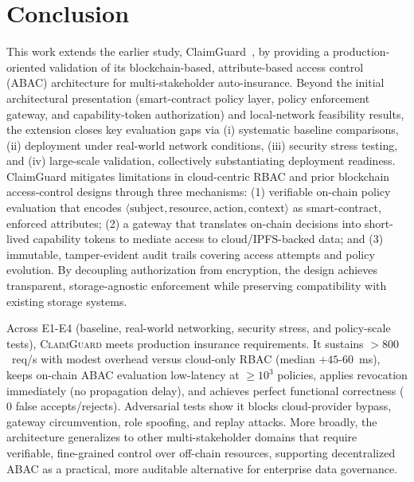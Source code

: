 \documentclass[final,5p,times,twocolumn]{elsarticle}
\begin{document}
\section{Conclusion}
This work extends the earlier study, ClaimGuard~\cite{eneh2025claimguard}, by providing a production-oriented validation of its blockchain-based, attribute-based access control (ABAC) architecture for multi-stakeholder auto-insurance. Beyond the initial architectural presentation (smart-contract policy layer, policy enforcement gateway, and capability-token authorization) and local-network feasibility results, the extension closes key evaluation gaps via (i) systematic baseline comparisons, (ii) deployment under real-world network conditions, (iii) security stress testing, and (iv) large-scale validation, collectively substantiating deployment readiness. ClaimGuard mitigates limitations in cloud-centric RBAC and prior blockchain access-control designs through three mechanisms: (1) verifiable on-chain policy evaluation that encodes $\langle\text{subject}, \text{resource}, \text{action}, \text{context}\rangle$ as smart-contract, enforced attributes; (2) a gateway that translates on-chain decisions into short-lived capability tokens to mediate access to cloud/IPFS-backed data; and (3) immutable, tamper-evident audit trails covering access attempts and policy evolution. By decoupling authorization from encryption, the design achieves transparent, storage-agnostic enforcement while preserving compatibility with existing storage systems.

Across E1-E4 (baseline, real-world networking, security stress, and policy-scale tests), \textsc{ClaimGuard} meets production insurance requirements. It sustains $>800$~req/s with modest overhead versus cloud-only RBAC (median $+45$-$60$~ms), keeps on-chain ABAC evaluation low-latency at $\geq 10^{3}$ policies, applies revocation immediately (no propagation delay), and achieves perfect functional correctness ($0$ false accepts/rejects). Adversarial tests show it blocks cloud-provider bypass, gateway circumvention, role spoofing, and replay attacks. More broadly, the architecture generalizes to other multi-stakeholder domains that require verifiable, fine-grained control over off-chain resources, supporting decentralized ABAC as a practical, more auditable alternative for enterprise data governance.
\end{document}
